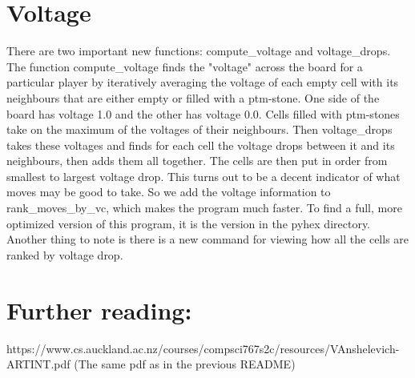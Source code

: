 \documentclass{article}
\begin{document}
\section*{Voltage}
There are two important new functions: compute\_voltage and voltage\_drops. The function compute\_voltage finds the "voltage" across the board for a particular player by iteratively averaging the voltage of each empty cell with its neighbours that are either empty or filled with a ptm-stone. One side of the board has voltage 1.0 and the other has voltage 0.0. Cells filled with ptm-stones take on the maximum of the voltages of their neighbours. Then voltage\_drops takes these voltages and finds for each cell the voltage drops between it and its neighbours, then adds them all together. The cells are then put in order from smallest to largest voltage drop. This turns out to be a decent indicator of what moves may be good to take. So we add the voltage information to rank\_moves\_by\_vc, which makes the program much faster. To find a full, more optimized version of this program, it is the version in the pyhex directory. Another thing to note is there is a new command for viewing how all the cells are ranked by voltage drop.
\section*{Further reading:}
	https://www.cs.auckland.ac.nz/courses/compsci767s2c/resources/VAnshelevich-ARTINT.pdf (The same pdf as in the previous README)
\end{document}

